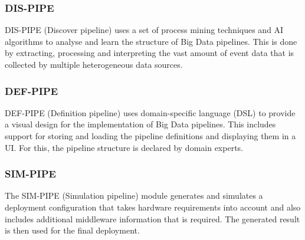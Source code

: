 \documentclass{article}
\begin{document}
        \subsubsection*{DIS-PIPE}
        \label{sec:discover-pipe-datacloud}
            
            DIS-PIPE (Discover pipeline) \cite{agostinelliDISPIPE2023} uses a set of process mining techniques and AI algorithms to analyse and learn the structure of Big Data pipelines. This is done by extracting, processing and interpreting the vast amount of event data that is collected by multiple heterogeneous data sources.
        
        \subsubsection*{DEF-PIPE}
        \label{sec:definition-pipe-datacloud}
            
            DEF-PIPE (Definition pipeline) \cite{mitrovicDEFPIPEFrontend2022} uses domain-specific language (DSL) \cite{jetbrainsWhatAreDomainSpecific} to provide a visual design for the implementation of Big Data pipelines.
            This includes support for storing and loading the pipeline definitions and displaying them in a UI. For this, the pipeline structure is declared by domain experts.
        
        \subsubsection*{SIM-PIPE}
        \label{sec:simulation-pipe-datacloud}
            
            The SIM-PIPE (Simulation pipeline) \cite{nikolovSIMPIPE} module generates and simulates a deployment configuration that takes hardware requirements into account and also includes additional middleware information that is required. The generated result is then used for the final deployment.
        
\end{document}

